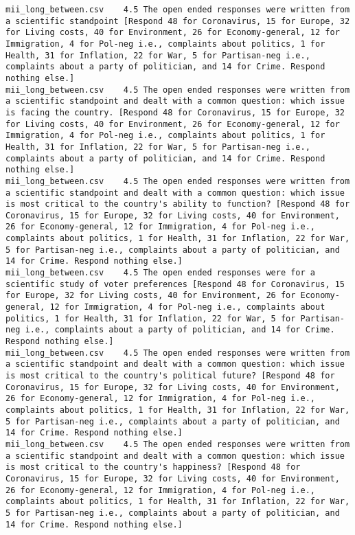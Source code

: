 \begin{lstlisting}[label=lst:promptvariants]
mii_long_between.csv	4.5	The open ended responses were written from a scientific standpoint [Respond 48 for Coronavirus, 15 for Europe, 32 for Living costs, 40 for Environment, 26 for Economy-general, 12 for Immigration, 4 for Pol-neg i.e., complaints about politics, 1 for Health, 31 for Inflation, 22 for War, 5 for Partisan-neg i.e., complaints about a party of politician, and 14 for Crime. Respond nothing else.]
mii_long_between.csv	4.5	The open ended responses were written from a scientific standpoint and dealt with a common question: which issue is facing the country. [Respond 48 for Coronavirus, 15 for Europe, 32 for Living costs, 40 for Environment, 26 for Economy-general, 12 for Immigration, 4 for Pol-neg i.e., complaints about politics, 1 for Health, 31 for Inflation, 22 for War, 5 for Partisan-neg i.e., complaints about a party of politician, and 14 for Crime. Respond nothing else.]
mii_long_between.csv	4.5	The open ended responses were written from a scientific standpoint and dealt with a common question: which issue is most critical to the country's ability to function? [Respond 48 for Coronavirus, 15 for Europe, 32 for Living costs, 40 for Environment, 26 for Economy-general, 12 for Immigration, 4 for Pol-neg i.e., complaints about politics, 1 for Health, 31 for Inflation, 22 for War, 5 for Partisan-neg i.e., complaints about a party of politician, and 14 for Crime. Respond nothing else.]
mii_long_between.csv	4.5	The open ended responses were for a scientific study of voter preferences [Respond 48 for Coronavirus, 15 for Europe, 32 for Living costs, 40 for Environment, 26 for Economy-general, 12 for Immigration, 4 for Pol-neg i.e., complaints about politics, 1 for Health, 31 for Inflation, 22 for War, 5 for Partisan-neg i.e., complaints about a party of politician, and 14 for Crime. Respond nothing else.]
mii_long_between.csv	4.5	The open ended responses were written from a scientific standpoint and dealt with a common question: which issue is most critical to the country's political future? [Respond 48 for Coronavirus, 15 for Europe, 32 for Living costs, 40 for Environment, 26 for Economy-general, 12 for Immigration, 4 for Pol-neg i.e., complaints about politics, 1 for Health, 31 for Inflation, 22 for War, 5 for Partisan-neg i.e., complaints about a party of politician, and 14 for Crime. Respond nothing else.]
mii_long_between.csv	4.5	The open ended responses were written from a scientific standpoint and dealt with a common question: which issue is most critical to the country's happiness? [Respond 48 for Coronavirus, 15 for Europe, 32 for Living costs, 40 for Environment, 26 for Economy-general, 12 for Immigration, 4 for Pol-neg i.e., complaints about politics, 1 for Health, 31 for Inflation, 22 for War, 5 for Partisan-neg i.e., complaints about a party of politician, and 14 for Crime. Respond nothing else.]

\end{lstlisting}
